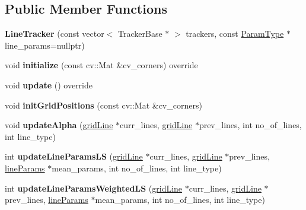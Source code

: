 \subsection*{Public Member Functions}
\begin{DoxyCompactItemize}
\item 
\hypertarget{classLineTracker_af75196bdbc5ca7911b6667e3e24b744b}{{\bfseries Line\-Tracker} (const vector$<$ Tracker\-Base $\ast$ $>$ trackers, const \hyperlink{structLineTrackerParams}{Param\-Type} $\ast$line\-\_\-params=nullptr)}\label{classLineTracker_af75196bdbc5ca7911b6667e3e24b744b}

\item 
\hypertarget{classLineTracker_a36a1b0fa3bbaa73a35c7b2084b5709e9}{void {\bfseries initialize} (const cv\-::\-Mat \&cv\-\_\-corners) override}\label{classLineTracker_a36a1b0fa3bbaa73a35c7b2084b5709e9}

\item 
\hypertarget{classLineTracker_a9ab4a07ef01a05be6e6a7057ae187ead}{void {\bfseries update} () override}\label{classLineTracker_a9ab4a07ef01a05be6e6a7057ae187ead}

\item 
\hypertarget{classLineTracker_a4f0afd192cd82b50b1b945c76e2c95f0}{void {\bfseries init\-Grid\-Positions} (const cv\-::\-Mat \&cv\-\_\-corners)}\label{classLineTracker_a4f0afd192cd82b50b1b945c76e2c95f0}

\item 
\hypertarget{classLineTracker_a12fe80abc0489d78b053fd9d0591be8f}{void {\bfseries update\-Alpha} (\hyperlink{structgridLine}{grid\-Line} $\ast$curr\-\_\-lines, \hyperlink{structgridLine}{grid\-Line} $\ast$prev\-\_\-lines, int no\-\_\-of\-\_\-lines, int line\-\_\-type)}\label{classLineTracker_a12fe80abc0489d78b053fd9d0591be8f}

\item 
\hypertarget{classLineTracker_a0bfc2cc4dce44b88f2dda19410aba866}{int {\bfseries update\-Line\-Params\-L\-S} (\hyperlink{structgridLine}{grid\-Line} $\ast$curr\-\_\-lines, \hyperlink{structgridLine}{grid\-Line} $\ast$prev\-\_\-lines, \hyperlink{structlineParams}{line\-Params} $\ast$mean\-\_\-params, int no\-\_\-of\-\_\-lines, int line\-\_\-type)}\label{classLineTracker_a0bfc2cc4dce44b88f2dda19410aba866}

\item 
\hypertarget{classLineTracker_a629ae9e222500152bf4b3fd1c90e17e8}{int {\bfseries update\-Line\-Params\-Weighted\-L\-S} (\hyperlink{structgridLine}{grid\-Line} $\ast$curr\-\_\-lines, \hyperlink{structgridLine}{grid\-Line} $\ast$prev\-\_\-lines, \hyperlink{structlineParams}{line\-Params} $\ast$mean\-\_\-params, int no\-\_\-of\-\_\-lines, int line\-\_\-type)}\label{classLineTracker_a629ae9e222500152bf4b3fd1c90e17e8}


\end{DoxyCompactItemize}
